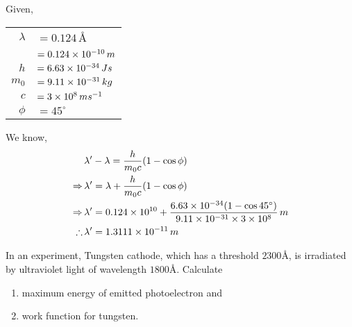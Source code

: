 \documentclass[../main.tex]{subfiles}
\begin{document}
\begin{soln}
    Given,
    \begin{table}[H]
        \begin{tabular}{rl}
            \hspace{2.5cm}$ \lambda $ & $ =0.124\,$\AA       \\
                                      & $ =0.124\times 10^{-10}\,m$  \\
            $ h $                     & $ =6.63\times 10^{-34}\,Js $ \\
            $ m_0$                    & $ =9.11\times 10^{-31}\,kg $ \\
            $ c$                      & $ =3\times 10^{8}\,ms^{-1} $ \\
            $ \phi$                   & $ =45^\circ $
        \end{tabular}
    \end{table}
    We know,
    \begin{align*}
                      & \lambda' -\lambda=\frac{h}{m_0c}(1-\cos \phi)                                       \\
        \Rightarrow\, & \lambda'=\lambda+\frac{h}{m_0c}(1-\cos \phi)                                        \\
        \Rightarrow\, & \lambda'=0.124\times 10^{10}+\frac{6.63\times 10^{-34}(1-\cos 45^\circ)}{9.11\times 10^{-31}\times 3\times 10^{8}}\,m \\
        \therefore \, & \lambda'=1.3111\times 10^{-11}\,m
    \end{align*}
\end{soln}
\newpage
\begin{prob}
    In an experiment, Tungsten cathode, which has a threshold $ 2300$\AA, is irradiated by ultraviolet light of wavelength $ 1800 $\AA. Calculate
    \begin{enumerate}[label=(\roman*)]
        \item maximum energy of emitted photoelectron and
        \item  work function for tungsten.
    \end{enumerate}
\end{prob}
\end{document}
